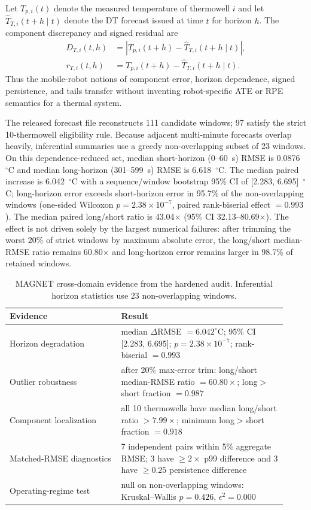 \documentclass[journal]{IEEEtran}
\begin{document}
Let $T_{p,i}(t)$ denote the measured temperature of thermowell $i$ and let $\widehat{T}_{T,i}(t+h\mid t)$ denote the DT forecast issued at time $t$ for horizon $h$. The component discrepancy and signed residual are
\begin{align}
D_{T,i}(t,h) &= \left|T_{p,i}(t+h)-\widehat{T}_{T,i}(t+h\mid t)\right|,\\
r_{T,i}(t,h) &= T_{p,i}(t+h)-\widehat{T}_{T,i}(t+h\mid t).
\end{align}
Thus the mobile-robot notions of component error, horizon dependence, signed persistence, and tails transfer without inventing robot-specific ATE or RPE semantics for a thermal system.

The released forecast file reconstructs 111 candidate windows; 97 satisfy the strict 10-thermowell eligibility rule. Because adjacent multi-minute forecasts overlap heavily, inferential summaries use a greedy non-overlapping subset of 23 windows. On this dependence-reduced set, median short-horizon (0--60~s) RMSE is 0.0876~$^{\circ}$C and median long-horizon (301--599~s) RMSE is 6.618~$^{\circ}$C. The median paired increase is 6.042~$^{\circ}$C with a sequence/window bootstrap 95\% CI of [2.283, 6.695]~$^{\circ}$C; long-horizon error exceeds short-horizon error in 95.7\% of the non-overlapping windows (one-sided Wilcoxon $p=2.38\times10^{-7}$, paired rank-biserial effect $=0.993$). The median paired long/short ratio is 43.04$\times$ (95\% CI 32.13--80.69$\times$). The effect is not driven solely by the largest numerical failures: after trimming the worst 20\% of strict windows by maximum absolute error, the long/short median-RMSE ratio remains 60.80$\times$ and long-horizon error remains larger in 98.7\% of retained windows.

\begin{table}[t]
\caption{MAGNET cross-domain evidence from the hardened audit. Inferential horizon statistics use 23 non-overlapping windows.}
\label{tab:magnet}
\centering
\scriptsize
\setlength{\tabcolsep}{2.5pt}
\begin{tabular}{p{0.37\linewidth}p{0.55\linewidth}}
\toprule
Evidence & Result \\
\midrule
Horizon degradation & median $\Delta$RMSE $=6.042^{\circ}$C; 95\% CI [2.283, 6.695]; $p=2.38\times10^{-7}$; rank-biserial $=0.993$ \\
Outlier robustness & after 20\% max-error trim: long/short median-RMSE ratio $=60.80\times$; long$>$short fraction $=0.987$ \\
Component localization & all 10 thermowells have median long/short ratio $>7.99\times$; minimum long$>$short fraction $=0.918$ \\
Matched-RMSE diagnostics & 7 independent pairs within 5\% aggregate RMSE; 3 have $\ge2\times$ p99 difference and 3 have $\ge0.25$ persistence difference \\
Operating-regime test & null on non-overlapping windows: Kruskal--Wallis $p=0.426$, $\epsilon^2=0.000$ \\
\bottomrule
\end{tabular}
\end{table}
\end{document}
